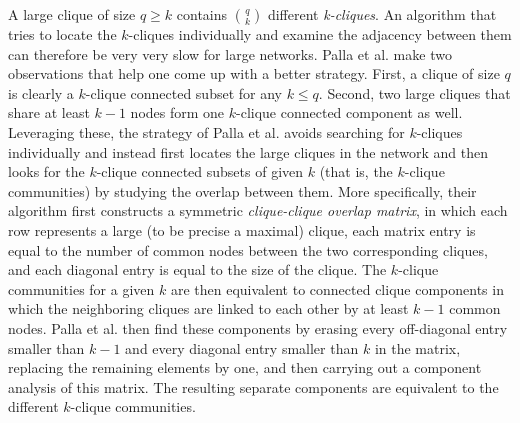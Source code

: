 A large clique of size $q \geq k $ contains $\binom{q}{k}$ different {\em k-cliques}.
An algorithm that tries to locate the $k$-cliques individually and examine the adjacency
between them can therefore be very very slow for large networks. 
Palla et al. make two observations that help one come up with a better strategy.
First, a clique of size $q$ is clearly a $k$-clique connected subset for any $k \leq q$. 
Second, two large cliques that share at least $k-1$ nodes form one $k$-clique connected component as well.
Leveraging these, the strategy of Palla et al. avoids searching for $k$-cliques individually
and instead first locates the large cliques in the network and then looks for the $k$-clique connected subsets of given $k$ (that is, the $k$-clique communities) by studying the overlap between them.
More specifically, their algorithm first constructs a symmetric {\em clique-clique overlap matrix}, 
in which each row represents a large (to be precise a maximal) clique, 
each matrix entry is equal to the number of common nodes between the two corresponding cliques, and each diagonal entry is equal to the size of the clique. 
The $k$-clique communities for a given $k$ are then equivalent to connected 
clique components in which the neighboring cliques are linked to each other by at least $k-1$ common nodes. Palla et al. then find these components by erasing every off-diagonal entry smaller than $k-1$ and every diagonal entry smaller than $k$ in the matrix, replacing the remaining elements by one, and then carrying out a component analysis of this matrix. The resulting separate components are equivalent to the different $k$-clique communities.
       



